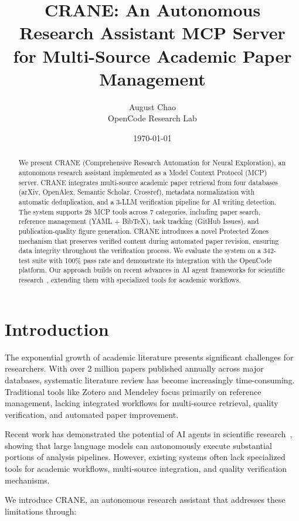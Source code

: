 \documentclass{article}
\title{CRANE: An Autonomous Research Assistant MCP Server\\for Multi-Source Academic Paper Management}
\author{August Chao\\OpenCode Research Lab}
\date{\today}
\begin{document}
\maketitle

\begin{abstract}
We present CRANE (Comprehensive Research Automation for Neural Exploration), an autonomous research assistant implemented as a Model Context Protocol (MCP) server. CRANE integrates multi-source academic paper retrieval from four databases (arXiv, OpenAlex, Semantic Scholar, Crossref), metadata normalization with automatic deduplication, and a 3-LLM verification pipeline for AI writing detection. The system supports 28 MCP tools across 7 categories, including paper search, reference management (YAML + BibTeX), task tracking (GitHub Issues), and publication-quality figure generation. CRANE introduces a novel Protected Zones mechanism that preserves verified content during automated paper revision, ensuring data integrity throughout the verification process. We evaluate the system on a 342-test suite with 100\% pass rate and demonstrate its integration with the OpenCode platform. Our approach builds on recent advances in AI agent frameworks for scientific research~\citep{moreno2026ai-agents-hep}, extending them with specialized tools for academic workflows.
\end{abstract}

\section{Introduction}
\label{sec:introduction}

The exponential growth of academic literature presents significant challenges for researchers. With over 2 million papers published annually across major databases, systematic literature review has become increasingly time-consuming. Traditional tools like Zotero and Mendeley focus primarily on reference management, lacking integrated workflows for multi-source retrieval, quality verification, and automated paper improvement.

Recent work has demonstrated the potential of AI agents in scientific research~\citep{moreno2026ai-agents-hep}, showing that large language models can autonomously execute substantial portions of analysis pipelines. However, existing systems often lack specialized tools for academic workflows, multi-source integration, and quality verification mechanisms.

We introduce CRANE, an autonomous research assistant that addresses these limitations through:
\end{document}
